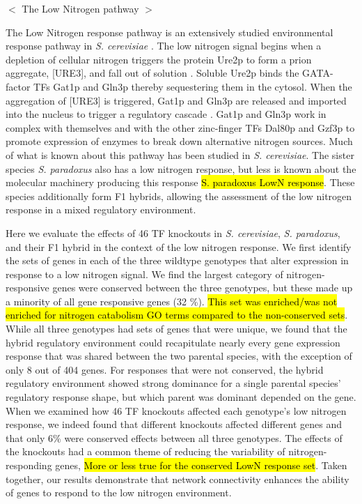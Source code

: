 $<$ The Low Nitrogen pathway $>$

The Low Nitrogen response pathway is an extensively studied environmental response pathway in \textit{S. cerevisiae} \cite{Magasanik2005}. The low nitrogen signal begins when a depletion of cellular nitrogen triggers the protein Ure2p to form a prion aggregate, [URE3], and fall out of solution \cite{Wickner1994}. Soluble Ure2p binds the GATA-factor TFs Gat1p and Gln3p thereby sequestering them in the cytosol. When the aggregation of [URE3] is triggered, Gat1p and Gln3p are released and imported into the nucleus to trigger a regulatory cascade \cite{Zhang2018}. Gat1p and Gln3p work in complex with themselves and with the other zinc-finger TFs Dal80p and Gzf3p to promote expression of enzymes to break down alternative nitrogen sources. Much of what is known about this pathway has been studied in \textit{S. cerevisiae}. The sister species \textit{S. paradoxus} also has a low nitrogen response, but less is known about the molecular machinery producing this response \hl{S. paradoxus LowN response}. These species additionally form F1 hybrids, allowing the assessment of the low nitrogen response in a mixed regulatory environment. 

Here we evaluate the effects of 46 TF knockouts in \textit{S. cerevisiae}, \textit{S. paradoxus}, and their F1 hybrid in the context of the low nitrogen response. We first identify the sets of genes in each of the three wildtype genotypes that alter expression in response to a low nitrogen signal. We find the largest category of nitrogen-responsive genes were conserved between the three genotypes, but these made up a minority of all gene responsive genes (32 \%). \hl{This set was enriched/was not enriched for nitrogen catabolism GO terms compared to the non-conserved sets}. While all three genotypes had sets of genes that were unique, we found that the hybrid regulatory environment could recapitulate nearly every gene expression response that was shared between the two parental species, with the exception of only 8 out of 404 genes. For responses that were not conserved, the hybrid regulatory environment showed strong dominance for a single parental species' regulatory response shape, but which parent was dominant depended on the gene. When we examined how 46 TF knockouts affected each genotype's low nitrogen response, we indeed found that different knockouts affected different genes and that only 6\% were conserved effects between all three genotypes. The effects of the knockouts had a common theme of reducing the variability of nitrogen-responding genes, \hl{More or less true for the conserved LowN response set}. Taken together, our results demonstrate that network connectivity enhances the ability of genes to respond to the low nitrogen environment.


